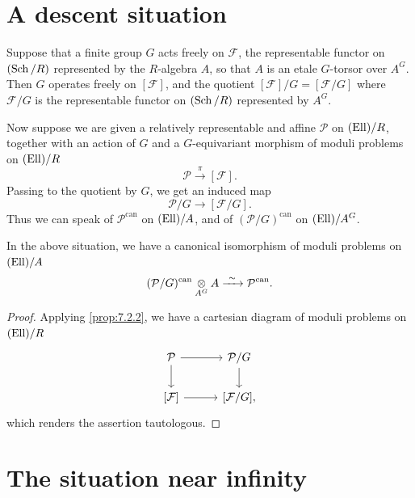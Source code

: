 \section{A descent situation}
\label{sec:9.2}

\kmitem\label{item:9.2.1}
Suppose that a finite group $G$ acts freely on $\mathcal{F}$, the representable functor on $(\operatorname{Sch}/R)$ represented by the $R$-algebra $A$, so that $A$ is an etale $G$-torsor over $A^G$. Then $G$ operates freely on $[\mathcal{F}]$, and the quotient $[\mathcal{F}]/G = [\mathcal{F}/G]$ where $\mathcal{F}/G$ is the representable functor on $(\operatorname{Sch}/R)$ represented by $A^G$.

Now suppose we are given a relatively representable and affine $\mathcal{P}$ on $(\mathrm{Ell})/R$, together with an action of $G$ and a $G$-equivariant morphism of moduli problems on $(\mathrm{Ell})/R$
\[
\mathcal{P} \xrightarrow{\ \pi\ } [\mathcal{F}] .
\]
Passing to the quotient by $G$, we get an induced map
\[
\mathcal{P}/G \to [\mathcal{F}/G] .
\]
Thus we can speak of $\mathcal{P}^{\mathrm{can}}$ on $(\mathrm{Ell})/A$, and of $(\mathcal{P}/G)^{\mathrm{can}}$ on $(\mathrm{Ell})/A^G$.

\begin{kprop}\label{prop:9.2.2}
In the above situation, we have a canonical isomorphism of moduli problems on $(\mathrm{Ell})/A$
\[
(\mathcal{P}/G)^{\mathrm{can}} \underset{A^G}{\otimes} A \xrightarrow{\ \sim\ } \mathcal{P}^{\mathrm{can}} .
\]
\end{kprop}

\begin{proof}
Applying \eqref{prop:7.2.2}, we have a cartesian diagram of moduli problems on $(\mathrm{Ell})/R$
\[
\begin{tikzcd}[row sep=1.8em, column sep=3em]
\mathcal{P} \arrow[r] \arrow[d] & \mathcal{P}/G \arrow[d] \\
{[\mathcal{F}]} \arrow[r] & {[\mathcal{F}/G]} ,
\end{tikzcd}
\]
which renders the assertion tautologous.
\end{proof}

\section{The situation near infinity}
\label{sec:9.3}

